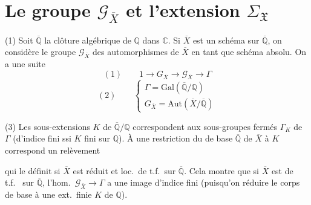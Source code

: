 \documentclass[11pt,a4paper]{article}
\begin{document}
\section{Le groupe $\mathcal{G}_{\overline{X}}$ et l'extension $\Sigma_{\mathfrak{X}}$}


(1) Soit $\overline{\mathbb{Q}}$ la clôture algébrique de $\mathbb{Q}$ dans
$\mathbb{C}$. Si  $\overline{X}$ est un schéma sur
$\overline{\mathbb{Q}}$, on considère le groupe $\mathcal{G}_{\overline{X}}$
des automorphismes de $\overline{X}$ en tant que schéma absolu. On a une suite
\[
  (1)\qquad 1 \to G_{\overline{X}} \longrightarrow \mathcal{G}_{\overline{X}}
  \longrightarrow \Gamma
\]
\[
  (2)\qquad \left\{
  \begin{array}{l}
    \Gamma = \mathrm{Gal}(\overline{\mathbb{Q}}/\mathbb{Q}) \\
    G_{\overline{X}} = \mathrm{Aut}(\overline{X}/\overline{\mathbb{Q}})
  \end{array}\right.
\]

(3) Les sous-extensions $K$ de $\overline{\mathbb{Q}}/\mathbb{Q}$ correspondent
aux sous-groupes fermés $\Gamma_K$ de $\Gamma$ (d'indice fini ssi $K$ fini sur
$\mathbb{Q}$). À une restriction du  de base
$\overline{\mathbb{Q}}$ de $\overline{X}$ à $K$ correspond un relèvement


qui le définit si $\overline{X}$ est réduit  et loc.\ de t.f.\ sur $\overline{\mathbb{Q}}$. Cela
montre que si $\overline{X}$ est de t.f.\ \struck{\ill{}} sur
$\overline{\mathbb{Q}}$, l'hom.\ $\mathcal{G}_{\overline{X}} \to \Gamma$ a une
image d'indice fini (puisqu'on  réduire le corps de
base à une ext.\ finie $K$ de $\mathbb{Q}$).
\end{document}
